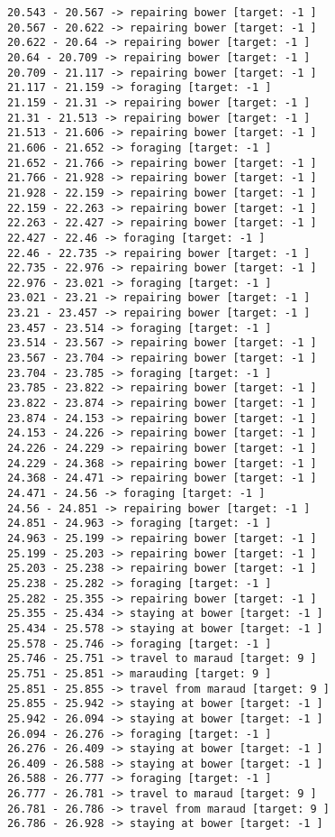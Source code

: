 \documentclass[11pt]{article}
\begin{document}
\begin{Verbatim}[commandchars=\\\{\}]
20.543 - 20.567 -> repairing bower [target: -1 ]
20.567 - 20.622 -> repairing bower [target: -1 ]
20.622 - 20.64 -> repairing bower [target: -1 ]
20.64 - 20.709 -> repairing bower [target: -1 ]
20.709 - 21.117 -> repairing bower [target: -1 ]
21.117 - 21.159 -> foraging [target: -1 ]
21.159 - 21.31 -> repairing bower [target: -1 ]
21.31 - 21.513 -> repairing bower [target: -1 ]
21.513 - 21.606 -> repairing bower [target: -1 ]
21.606 - 21.652 -> foraging [target: -1 ]
21.652 - 21.766 -> repairing bower [target: -1 ]
21.766 - 21.928 -> repairing bower [target: -1 ]
21.928 - 22.159 -> repairing bower [target: -1 ]
22.159 - 22.263 -> repairing bower [target: -1 ]
22.263 - 22.427 -> repairing bower [target: -1 ]
22.427 - 22.46 -> foraging [target: -1 ]
22.46 - 22.735 -> repairing bower [target: -1 ]
22.735 - 22.976 -> repairing bower [target: -1 ]
22.976 - 23.021 -> foraging [target: -1 ]
23.021 - 23.21 -> repairing bower [target: -1 ]
23.21 - 23.457 -> repairing bower [target: -1 ]
23.457 - 23.514 -> foraging [target: -1 ]
23.514 - 23.567 -> repairing bower [target: -1 ]
23.567 - 23.704 -> repairing bower [target: -1 ]
23.704 - 23.785 -> foraging [target: -1 ]
23.785 - 23.822 -> repairing bower [target: -1 ]
23.822 - 23.874 -> repairing bower [target: -1 ]
23.874 - 24.153 -> repairing bower [target: -1 ]
24.153 - 24.226 -> repairing bower [target: -1 ]
24.226 - 24.229 -> repairing bower [target: -1 ]
24.229 - 24.368 -> repairing bower [target: -1 ]
24.368 - 24.471 -> repairing bower [target: -1 ]
24.471 - 24.56 -> foraging [target: -1 ]
24.56 - 24.851 -> repairing bower [target: -1 ]
24.851 - 24.963 -> foraging [target: -1 ]
24.963 - 25.199 -> repairing bower [target: -1 ]
25.199 - 25.203 -> repairing bower [target: -1 ]
25.203 - 25.238 -> repairing bower [target: -1 ]
25.238 - 25.282 -> foraging [target: -1 ]
25.282 - 25.355 -> repairing bower [target: -1 ]
25.355 - 25.434 -> staying at bower [target: -1 ]
25.434 - 25.578 -> staying at bower [target: -1 ]
25.578 - 25.746 -> foraging [target: -1 ]
25.746 - 25.751 -> travel to maraud [target: 9 ]
25.751 - 25.851 -> marauding [target: 9 ]
25.851 - 25.855 -> travel from maraud [target: 9 ]
25.855 - 25.942 -> staying at bower [target: -1 ]
25.942 - 26.094 -> staying at bower [target: -1 ]
26.094 - 26.276 -> foraging [target: -1 ]
26.276 - 26.409 -> staying at bower [target: -1 ]
26.409 - 26.588 -> staying at bower [target: -1 ]
26.588 - 26.777 -> foraging [target: -1 ]
26.777 - 26.781 -> travel to maraud [target: 9 ]
26.781 - 26.786 -> travel from maraud [target: 9 ]
26.786 - 26.928 -> staying at bower [target: -1 ]

\end{Verbatim}
\end{document}
